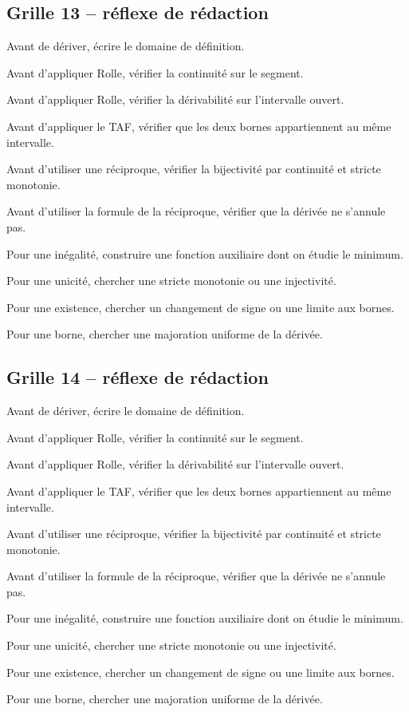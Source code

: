 \documentclass[11pt,a4paper]{article}
\begin{document}
\subsection*{Grille 13 -- réflexe de rédaction}

\begin{methodebox}

Avant de dériver, écrire le domaine de définition.

Avant d'appliquer Rolle, vérifier la continuité sur le segment.

Avant d'appliquer Rolle, vérifier la dérivabilité sur l'intervalle ouvert.

Avant d'appliquer le TAF, vérifier que les deux bornes appartiennent au même intervalle.

Avant d'utiliser une réciproque, vérifier la bijectivité par continuité et stricte monotonie.

Avant d'utiliser la formule de la réciproque, vérifier que la dérivée ne s'annule pas.

Pour une inégalité, construire une fonction auxiliaire dont on étudie le minimum.

Pour une unicité, chercher une stricte monotonie ou une injectivité.

Pour une existence, chercher un changement de signe ou une limite aux bornes.

Pour une borne, chercher une majoration uniforme de la dérivée.

\end{methodebox}

\subsection*{Grille 14 -- réflexe de rédaction}

\begin{methodebox}

Avant de dériver, écrire le domaine de définition.

Avant d'appliquer Rolle, vérifier la continuité sur le segment.

Avant d'appliquer Rolle, vérifier la dérivabilité sur l'intervalle ouvert.

Avant d'appliquer le TAF, vérifier que les deux bornes appartiennent au même intervalle.

Avant d'utiliser une réciproque, vérifier la bijectivité par continuité et stricte monotonie.

Avant d'utiliser la formule de la réciproque, vérifier que la dérivée ne s'annule pas.

Pour une inégalité, construire une fonction auxiliaire dont on étudie le minimum.

Pour une unicité, chercher une stricte monotonie ou une injectivité.

Pour une existence, chercher un changement de signe ou une limite aux bornes.

Pour une borne, chercher une majoration uniforme de la dérivée.

\end{methodebox}
\end{document}
